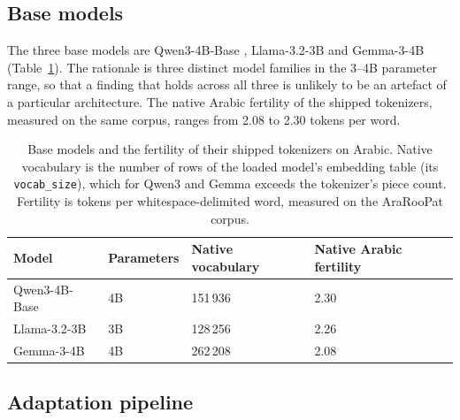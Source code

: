\documentclass[a4paper,fleqn]{cas-sc}
\begin{document}
\subsection{Base models}
\label{sec:protocol:models}

The three base models are Qwen3-4B-Base \citep{yang2025qwen3}, Llama-3.2-3B \citep{grattafiori2024llama3} and Gemma-3-4B \citep{gemma2025} (Table~\ref{tab:models}). The rationale is three distinct model families in the 3--4B parameter range, so that a finding that holds across all three is unlikely to be an artefact of a particular architecture. The native Arabic fertility of the shipped tokenizers, measured on the same corpus, ranges from 2.08 to 2.30 tokens per word.

\begin{table}[t]
\centering
\caption{Base models and the fertility of their shipped tokenizers on Arabic. Native vocabulary is the number of rows of the loaded model's embedding table (its \texttt{vocab\_size}), which for Qwen3 and Gemma exceeds the tokenizer's piece count. Fertility is tokens per whitespace-delimited word, measured on the AraRooPat corpus.}
\label{tab:models}
\begin{tabular}{@{}llll@{}}
\toprule
Model & Parameters & Native vocabulary & Native Arabic fertility \\
\midrule
Qwen3-4B-Base & 4B & 151\,936 & 2.30 \\
Llama-3.2-3B & 3B & 128\,256 & 2.26 \\
Gemma-3-4B & 4B & 262\,208 & 2.08 \\
\bottomrule
\end{tabular}
\end{table}

\subsection{Adaptation pipeline}
\label{sec:protocol:pipeline}
\end{document}
